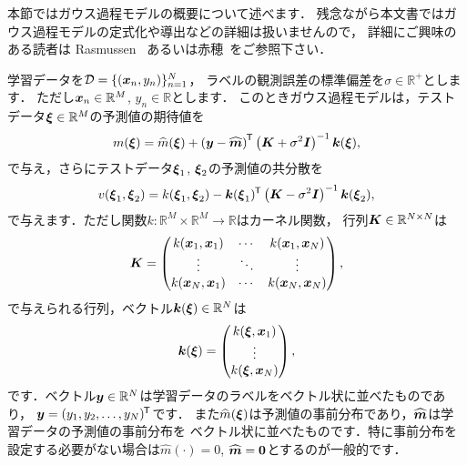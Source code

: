 %

本節ではガウス過程モデルの概要について述べます．
残念ながら本文書ではガウス過程モデルの定式化や導出などの詳細は扱いませんので，
詳細にご興味のある読者は Rasmussen~\cite{Rasmussen2006} あるいは赤穂~\cite{Akaho2018}をご参照下さい．

学習データを$\mathcal{D} = \{ (\boldsymbol{x}_n, y_n) \}_{n=1}^{N}$，
ラベルの観測誤差の標準偏差を$\sigma \in \mathbb{R}^{+}$とします．
ただし$\boldsymbol{x}_n \in \mathbb{R}^M$, $y_n \in \mathbb{R}$とします．
このときガウス過程モデルは，テストデータ$\boldsymbol{\xi} \in \mathbb{R}^M$の予測値の期待値を
\begin{equation}
    m(\boldsymbol{\xi}) = \widehat{m}(\boldsymbol{\xi}) + \left( \boldsymbol{y} - \widehat{\boldsymbol{m}} \right)^{\mkern-1.5mu\mathsf{T}}
      \left( \boldsymbol{K} + \sigma^2 \boldsymbol{I} \right)^{-1} \boldsymbol{k}(\boldsymbol{\xi}),
    \label{eqn:gp_exp}
\end{equation}
で与え，さらにテストデータ$\boldsymbol{\xi}_1$, $\boldsymbol{\xi}_2$の予測値の共分散を
\begin{equation}
    v(\boldsymbol{\xi}_1, \boldsymbol{\xi}_2) = k(\boldsymbol{\xi}_1, \boldsymbol{\xi}_2)
    - \boldsymbol{k}(\boldsymbol{\xi}_1)^{\mkern-1.5mu\mathsf{T}} \left( \boldsymbol{K} - \sigma^2 \boldsymbol{I} \right)^{-1} \boldsymbol{k}(\boldsymbol{\xi}_2),
    \label{eqn:gp_cov}
\end{equation}
で与えます．ただし関数$k: \mathbb{R}^M \times \mathbb{R}^M \to \mathbb{R}$はカーネル関数，
行列$\boldsymbol{K} \in \mathbb{R}^{N \times N}$は
\begin{equation}
    \boldsymbol{K} = \begin{pmatrix}
        k(\boldsymbol{x}_1, \boldsymbol{x}_1) & \cdots & k(\boldsymbol{x}_1, \boldsymbol{x}_N) \\
        \vdots                & \ddots & \vdots                \\
        k(\boldsymbol{x}_N, \boldsymbol{x}_1) & \cdots & k(\boldsymbol{x}_N, \boldsymbol{x}_N) \\
    \end{pmatrix},
\end{equation}
で与えられる行列，ベクトル$\boldsymbol{k}(\boldsymbol{\xi}) \in \mathbb{R}^N$は
\begin{equation}
    \boldsymbol{k}(\boldsymbol{\xi}) = \begin{pmatrix}
        k(\boldsymbol{\xi}, \boldsymbol{x}_1) \\
        \vdots                \\
        k(\boldsymbol{\xi}, \boldsymbol{x}_N) \\
    \end{pmatrix},
\end{equation}
です．ベクトル$\boldsymbol{y} \in \mathbb{R}^N$は学習データのラベルをベクトル状に並べたものであり，
$\boldsymbol{y} = (y_1, y_2, \ldots, y_N)^{\mkern-1.5mu\mathsf{T}}$です．
また$\widehat{m}(\boldsymbol{\xi})$は予測値の事前分布であり，$\widehat{\boldsymbol{m}}$は学習データの予測値の事前分布を
ベクトル状に並べたものです．特に事前分布を設定する必要がない場合は$\widehat{m}(\cdot) 
= 0$, $\widehat{\boldsymbol{m}} = \boldsymbol{0}$とするのが一般的です．

